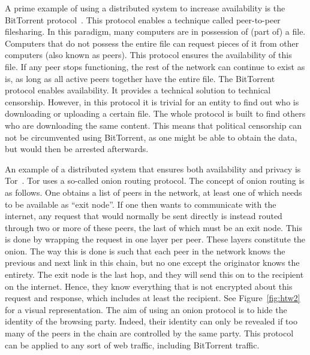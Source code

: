 \documentclass[a4paper,11pt]{book}
\theoremstyle{definition}
\begin{document}
A prime example of using a distributed system to increase availability is the 
BitTorrent protocol~\cite{cohen2008BitTorrent}. This protocol enables a technique
called peer-to-peer filesharing.
In this paradigm, many computers are in possession of (part of) a file. Computers
that do not possess the entire file can request pieces of it from other
computers (also known as peers). This protocol ensures the availability of this
file. If any peer stops functioning, the rest of
the network can continue to exist as is, as long as all active peers together have the
entire file. The BitTorrent protocol enables availability. It provides a technical
solution to technical censorship. However, in this protocol it is trivial for an
entity to find out who is downloading or uploading a certain file. The whole
protocol is built to find others who are downloading the same content. This means 
that political censorship can not be circumvented using BitTorrent, as one might
be able to obtain the data, but would then be arrested afterwards.

An example of a distributed system that ensures both availability and privacy is
Tor~\cite{dingledine2004tor}. Tor uses a so-called onion routing protocol. 
The concept of onion routing is as follows. One obtains a list of peers in the
network, at least one of which needs to be available as ``exit node''. If one
then wants to communicate with the internet, any request that would normally
be sent directly is instead routed through two or more of these peers, the last
of which must be an exit node. This is done by wrapping the request in one
layer per peer. These layers constitute the onion. The way this is done is such
that each peer in the network knows the previous and next link in this chain,
but no one except the originator knows the entirety. The exit node is the last
hop, and they will send this on to the recipient on the internet. Hence, they
know everything that is not encrypted about this request and response, which includes at
least the recipient. See Figure~\ref{fig:htw2} for a visual representation.
The aim of using an onion protocol is to hide the identity of the browsing party. Indeed,
their identity can only be revealed if too many of the peers in the chain are controlled
by the same party. This protocol can be applied to any sort of web traffic, including
BitTorrent traffic. 
\end{document}
